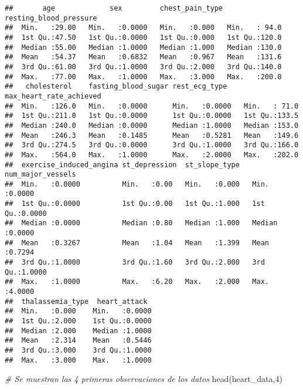 \documentclass[
]{article}
\newenvironment{Shaded}{\begin{snugshade}}{\end{snugshade}}
\newcommand{\CommentTok}[1]{\textcolor[rgb]{0.56,0.35,0.01}{\textit{#1}}}
\newcommand{\DecValTok}[1]{\textcolor[rgb]{0.00,0.00,0.81}{#1}}
\newcommand{\FunctionTok}[1]{\textcolor[rgb]{0.00,0.00,0.00}{#1}}
\newcommand{\NormalTok}[1]{#1}
\begin{document}
\begin{verbatim}
##       age             sex         chest_pain_type resting_blood_pressure
##  Min.   :29.00   Min.   :0.0000   Min.   :0.000   Min.   : 94.0         
##  1st Qu.:47.50   1st Qu.:0.0000   1st Qu.:0.000   1st Qu.:120.0         
##  Median :55.00   Median :1.0000   Median :1.000   Median :130.0         
##  Mean   :54.37   Mean   :0.6832   Mean   :0.967   Mean   :131.6         
##  3rd Qu.:61.00   3rd Qu.:1.0000   3rd Qu.:2.000   3rd Qu.:140.0         
##  Max.   :77.00   Max.   :1.0000   Max.   :3.000   Max.   :200.0         
##   cholesterol    fasting_blood_sugar rest_ecg_type    max_heart_rate_achieved
##  Min.   :126.0   Min.   :0.0000      Min.   :0.0000   Min.   : 71.0          
##  1st Qu.:211.0   1st Qu.:0.0000      1st Qu.:0.0000   1st Qu.:133.5          
##  Median :240.0   Median :0.0000      Median :1.0000   Median :153.0          
##  Mean   :246.3   Mean   :0.1485      Mean   :0.5281   Mean   :149.6          
##  3rd Qu.:274.5   3rd Qu.:0.0000      3rd Qu.:1.0000   3rd Qu.:166.0          
##  Max.   :564.0   Max.   :1.0000      Max.   :2.0000   Max.   :202.0          
##  exercise_induced_angina st_depression  st_slope_type   num_major_vessels
##  Min.   :0.0000          Min.   :0.00   Min.   :0.000   Min.   :0.0000   
##  1st Qu.:0.0000          1st Qu.:0.00   1st Qu.:1.000   1st Qu.:0.0000   
##  Median :0.0000          Median :0.80   Median :1.000   Median :0.0000   
##  Mean   :0.3267          Mean   :1.04   Mean   :1.399   Mean   :0.7294   
##  3rd Qu.:1.0000          3rd Qu.:1.60   3rd Qu.:2.000   3rd Qu.:1.0000   
##  Max.   :1.0000          Max.   :6.20   Max.   :2.000   Max.   :4.0000   
##  thalassemia_type  heart_attack   
##  Min.   :0.000    Min.   :0.0000  
##  1st Qu.:2.000    1st Qu.:0.0000  
##  Median :2.000    Median :1.0000  
##  Mean   :2.314    Mean   :0.5446  
##  3rd Qu.:3.000    3rd Qu.:1.0000  
##  Max.   :3.000    Max.   :1.0000
\end{verbatim}

\begin{Shaded}
\begin{Highlighting}[]
\CommentTok{\# Se muestran las 4 primeras observaciones de los datos}
\FunctionTok{head}\NormalTok{(heart\_data,}\DecValTok{4}\NormalTok{)}
\end{Highlighting}
\end{Shaded}
\end{document}
